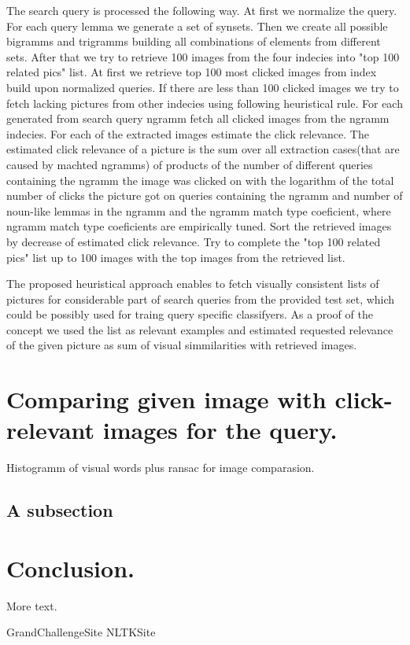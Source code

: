 \documentclass[11pt]{article} %
\begin{document}
The search query is processed the following way. At first we normalize the query. For each query lemma we generate a set of synsets\cite{NLTKSite}. Then we create all possible bigramms and trigramms building all combinations of elements from different sets. After that we try to retrieve 100 images from the four indecies into "top 100 related pics" list. At first we retrieve top 100 most clicked images from index build upon normalized queries. If there are less than 100 clicked images we try to fetch lacking pictures from other indecies using following heuristical rule. For each generated from search query ngramm fetch all clicked images from the ngramm indecies. For each  of the extracted images estimate the click relevance. The estimated click relevance of a picture is the sum over all extraction cases(that are caused by machted ngramms) of products of the number of different queries containing the ngramm the image was clicked on with the logarithm of the total number of clicks the picture got on queries containing the ngramm and number of noun-like lemmas in the ngramm and the ngramm match type coeficient, where ngramm match type coeficients are empirically tuned. Sort the retrieved images by decrease of estimated click relevance. Try  to complete the "top 100 related pics" list up to 100 images with the top images from the retrieved list.

The proposed heuristical approach enables to fetch visually consistent lists of  pictures for considerable part of search queries from the provided test set, which could be possibly used for traing query specific classifyers.  As a proof of the concept we used the list as relevant examples and estimated requested relevance of the given picture as sum of visual simmilarities with retrieved images.

\section{Comparing given image with click-relevant images for the query.}

Histogramm of visual words plus ransac for image comparasion.

\subsection{A subsection}

\section{Conclusion.}

More text.

\begin{thebibliography}{widest entry}
 GrandChallengeSite
 NLTKSite
\end{thebibliography}
\end{document}
